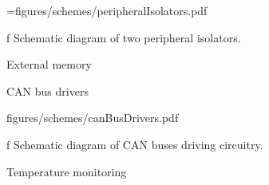 \midinsert
    \picw=\hsize \cinspic figures/schemes/peripheralIsolators.pdf
    \caption/f Schematic diagram of two peripheral isolators.
\endinsert


\sec External memory


\sec CAN bus drivers

\midinsert
    \hsize \cinspic figures/schemes/canBusDrivers.pdf
    \caption/f Schematic diagram of CAN buses driving circuitry.
\endinsert


\sec Temperature monitoring
